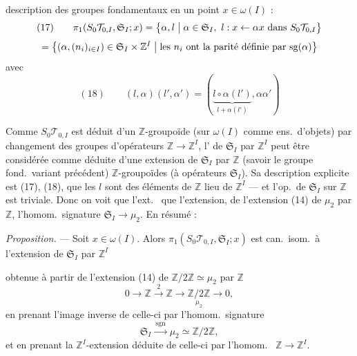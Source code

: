 \documentclass[11pt,a4paper]{article}
\begin{document}
description des groupes fondamentaux  en un point $x \in \omega(I)$ :
\[
  (17) \qquad \pi_1(S_0\mathcal{T}_{0,I}, \mathfrak{S}_I; x)
  = \bigl\{ \alpha, l \bigm| \alpha \in \mathfrak{S}_I,\ l : x \leftarrow \alpha x \text{ dans } S_0\mathcal{T}_{0,I} \bigr\}
\]
\[
  = \bigl\{ (\alpha, (n_i)_{i\in I}) \in \mathfrak{S}_I \times \mathbb{Z}^I \bigm|
  \text{les $n_i$ ont la parité définie par $\mathrm{sg}(\alpha)$} \bigr\}
\]
avec 
\[
  (18) \qquad (l, \alpha)(l', \alpha') = (\underbrace{l \circ \alpha(l')}_{l + \alpha(l')}, \alpha\alpha')
\]

Comme $S_0\mathcal{T}_{0,I}$ est déduit d'un $\mathbb{Z}$-groupoïde (sur $\omega(I)$ comme ens.\ d'objets) par changement des groupes d'opérateurs \ill{} $\mathbb{Z} \to \mathbb{Z}^I$, l' \ill{} de $\mathfrak{S}_I$ par $\mathbb{Z}^I$ peut être considérée comme \ill{} déduite d'une extension de $\mathfrak{S}_I$ par $\mathbb{Z}$ (savoir le groupe fond.\ variant \ill{} précédent) \ill{} \ill{} \ill{} $\mathbb{Z}$-groupoïdes \ill{} (à opérateurs $\mathfrak{S}_I$).
Sa description explicite est \ill{} \ill{} \struck{\ill{}} \ill{} (17), (18), \ill{} que les $l$ sont des éléments de $\mathbb{Z}$ \ill{} lieu de $\mathbb{Z}^I$ --- et l'op.\ de $\mathfrak{S}_I$ sur $\mathbb{Z}$ est triviale. Donc on voit que l'ext.\ \ill{} \ill{} \ill{} que l'extension,  \ill{} de l'extension (14) de $\mu_2$ par $\mathbb{Z}$, \ill{} \ill{} l'homom.\ signature $\mathfrak{S}_I \to \mu_2$. En résumé :

\textit{Proposition.} --- Soit $x \in \omega(I)$. Alors $\pi_1(S_0\mathcal{T}_{0,I}, \mathfrak{S}_I; x)$ est can.\ isom.\ à  l'extension de $\mathfrak{S}_I$ par $\mathbb{Z}^I$

obtenue à partir de l'extension (14) de $\mathbb{Z}/2\mathbb{Z} \simeq \mu_2$ par $\mathbb{Z}$
\[
  0 \to \mathbb{Z} \xrightarrow{\ 2\ } \mathbb{Z} \to \underset{\mu_2}{\mathbb{Z}/2\mathbb{Z}} \to 0 ,
\]
en prenant l'image inverse de celle-ci par l'homom.\ signature
\[
  \mathfrak{S}_I \xrightarrow{\ \mathrm{sgn}\ } \mu_2 \simeq \mathbb{Z}/2\mathbb{Z} ,
\]
et en prenant la $\mathbb{Z}^I$-extension déduite de celle-ci par l'homom.\  $\mathbb{Z} \to \mathbb{Z}^I$.
\end{document}
